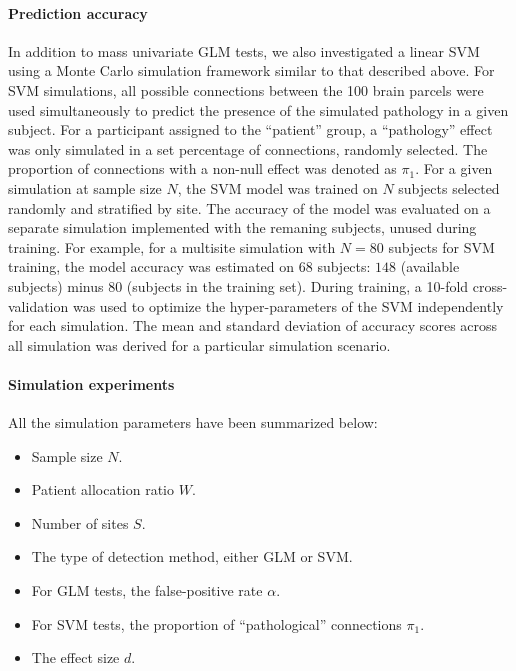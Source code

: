 \documentclass[authoryear]{elsarticle}
\begin{document}

\paragraph{Prediction accuracy}
In addition to mass univariate GLM tests, we also investigated a linear SVM \citep{Cortes1995} using a Monte Carlo simulation framework similar to that described above. For SVM simulations, all possible connections between the 100 brain parcels were used simultaneously to predict the presence of the simulated pathology in a given subject. For a participant assigned to the ``patient'' group, a ``pathology'' effect was only simulated in a set percentage of connections, randomly selected. The proportion of connections with a non-null effect was denoted as $\pi_1$. For a given simulation at sample size $N$, the SVM model was trained on $N$ subjects selected randomly and stratified by site. The accuracy of the model was evaluated on a separate simulation implemented with the remaning subjects, unused during training. For example, for a multisite simulation with $N=80$ subjects for SVM training, the model accuracy was estimated on $68$ subjects: $148$ (available subjects) minus $80$ (subjects in the training set). During training, a 10-fold cross-validation was used to optimize the hyper-parameters of the SVM independently for each simulation. The mean and standard deviation of accuracy scores across all simulation was derived for a particular simulation scenario.

\paragraph{Simulation experiments}

All the simulation parameters have been summarized below: 
\begin{itemize}
 \item Sample size $N$. 
 \item Patient allocation ratio $W$. 
 \item Number of sites $S$. 
 \item The type of detection method, either GLM or SVM. 
 \item For GLM tests, the false-positive rate $\alpha$. 
 \item For SVM tests, the proportion of ``pathological'' connections $\pi_1$.
 \item The effect size $d$. 
\end{itemize}
\end{document}
